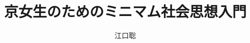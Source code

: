 \documentclass[uplatex,dvipdfmx,openany,oneside,report]{bxjsbook}
\author{江口聡}
\title{京女生のためのミニマム社会思想入門}
\begin{document}
\maketitle{}
\frontmatter

\tableofcontents{}

\mainmatter










 

 








% 

  

\end{document}
